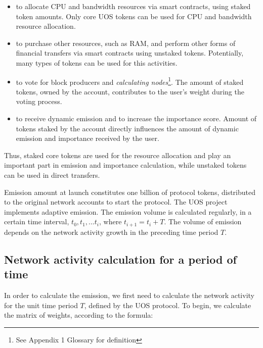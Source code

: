 \documentclass[a4paper,12pt]{article}
\begin{document}
\begin{itemize}
\item to allocate CPU and bandwidth resources via smart contracts, using staked token amounts. Only core U{\degree}OS tokens can be used for CPU and bandwidth resource allocation.
\item to purchase other resources, such as RAM, and perform other forms of financial transfers via smart contracts using unstaked tokens. Potentially, many types of tokens can be used for this activities.
\item to vote for block producers and \emph{calculating nodes}\footnote{See Appendix 1 Glossary for definition}. The amount of staked tokens, owned by the account, contributes to the user's weight during the voting process.
\item to receive dynamic emission and to increase the importance score. Amount of tokens staked by the account directly influences the amount of dynamic emission and importance received by the user.
\end{itemize}

Thus, staked core tokens are used for the resource allocation and play an important part in emission and importance calculation, while unstaked tokens can be used in direct transfers. 

Emission amount at launch constitutes one billion of protocol tokens, distributed to the original network accounts to start the protocol. The U{\degree}OS project implements adaptive emission. The emission volume is calculated regularly, in a certain time interval, $t_0, t_1, ... t_i$, where $t_{i+1} = t_i + T$. The volume of emission depends on the network activity growth in the preceding time period $T$.


\subsection{Network activity calculation for a period of time}

In order to calculate the emission, we first need to calculate the network activity for the unit time period $T$, defined by the U{\degree}OS protocol. To begin, we calculate the matrix of weights, according to the formula:
\end{document}
